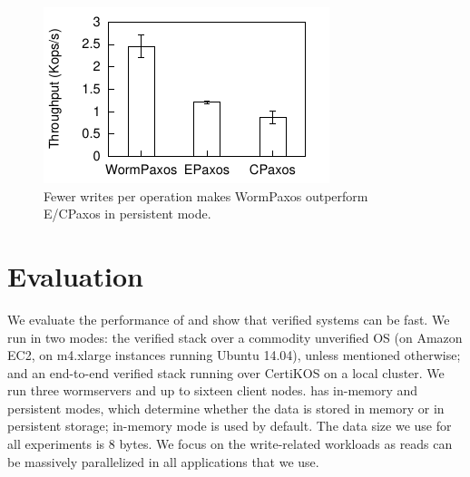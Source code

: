 \begin{figure}
\begin{minipage}[t]{0.32\textwidth}
\includegraphics{graphs/paxos_persist_tput}
\caption{Fewer writes per operation makes WormPaxos outperform E/CPaxos in persistent mode.\label{fig:paxos-persist}}
\end{minipage}
\end{figure}

\section{Evaluation}
\label{sec:eval}

We evaluate the performance of \sysname{} and show that verified systems can be fast. We run in two modes: the verified \sysname{} stack over a commodity unverified OS (on Amazon EC2, on m4.xlarge instances running Ubuntu 14.04), unless mentioned otherwise; and an end-to-end verified stack running over CertiKOS on a local cluster. We run three wormservers and up to sixteen client nodes. \sysname{} has in-memory and persistent modes, which determine whether the data is stored in memory or in persistent storage; in-memory mode is used by default. The data size we use for all experiments is 8 bytes. We focus on the write-related workloads as reads can be massively parallelized in all applications that we use. %

